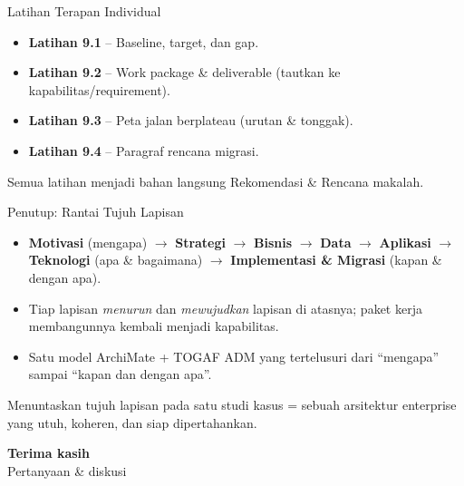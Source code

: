 \documentclass[aspectratio=169, table]{beamer}
\newcommand{\takeaway}[1]{%
  \vspace{4pt}
  {\footnotesize #1}
}
\begin{document}
\begin{frame}{Latihan Terapan Individual}
  \vspace{8pt}
  \begin{itemize}
    \item \textbf{Latihan 9.1} -- Baseline, target, dan gap.
    \item \textbf{Latihan 9.2} -- Work package \& deliverable (tautkan ke
          kapabilitas/requirement).
    \item \textbf{Latihan 9.3} -- Peta jalan berplateau (urutan \& tonggak).
    \item \textbf{Latihan 9.4} -- Paragraf rencana migrasi.
  \end{itemize}
  \takeaway{Semua latihan menjadi bahan langsung Rekomendasi \& Rencana makalah.}
\end{frame}

\begin{frame}{Penutup: Rantai Tujuh Lapisan}
  \vspace{6pt}
  \footnotesize
  \begin{itemize}\setlength{\itemsep}{2.0pt}
    \item \textbf{Motivasi} (mengapa) $\rightarrow$ \textbf{Strategi} $\rightarrow$
          \textbf{Bisnis} $\rightarrow$ \textbf{Data} $\rightarrow$
          \textbf{Aplikasi} $\rightarrow$ \textbf{Teknologi} (apa \& bagaimana)
          $\rightarrow$ \textbf{Implementasi \& Migrasi} (kapan \& dengan apa).
    \item Tiap lapisan \emph{menurun} dan \emph{mewujudkan} lapisan di atasnya;
          paket kerja membangunnya kembali menjadi kapabilitas.
    \item Satu model ArchiMate + TOGAF ADM yang tertelusuri dari ``mengapa''
          sampai ``kapan dan dengan apa''.
  \end{itemize}
  \takeaway{Menuntaskan tujuh lapisan pada satu studi kasus = sebuah arsitektur
  enterprise yang utuh, koheren, dan siap dipertahankan.}
\end{frame}

\begin{frame}{\hfill}
  \centering
  \Huge{\textbf{Terima kasih}}\\[8pt]
  \normalsize Pertanyaan \& diskusi
\end{frame}
\end{document}
